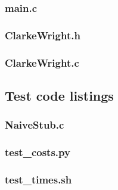 \documentclass[a4paper]{article}
\begin{document}
            \subsubsection{main.c}
                
            \subsubsection{ClarkeWright.h}
                
            \subsubsection{ClarkeWright.c}
                
        \subsection{Test code listings}
            \subsubsection{NaiveStub.c}
                
            \subsubsection{test\_costs.py}
                
            \subsubsection{test\_times.sh}
                
\end{document}
